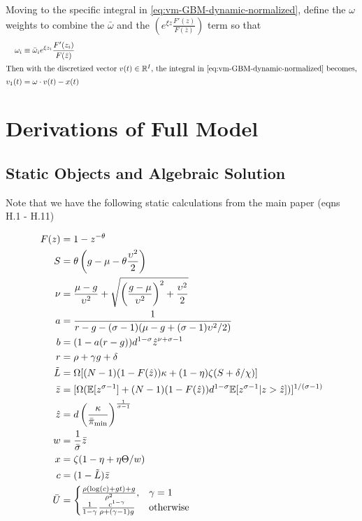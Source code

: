 \documentclass[11pt]{article}
\newcommand{\R}{\ensuremath{\mathbb{R}}}
\begin{document}
Moving to the specific integral in \cref{eq:vm-GBM-dynamic-normalized}, define the $\omega$ weights to combine the $\bar{\omega}$ and the $\left(e^{\xi z} \frac{F'(z)}{F(\bar{z})}\right)$ term so that
\begin{align}
\omega_i &\equiv \bar{\omega}_i e^{\xi z_i}\frac{F'(z_i)}{F(\bar{z})}\\
\intertext{Then with the discretized vector $v(t) \in \R^I$, the integral in \cref{eq:vm-GBM-dynamic-normalized} becomes,}
v_1(t) &= \omega \cdot v(t) - x(t)
\end{align}

\section{Derivations of Full Model}\label{sec:full-model-derivations}

\subsection{Static Objects and Algebraic Solution}\label{sec:full-algebraic-solution}

Note that we have the following static calculations from the main paper (eqns H.1 - H.11)

\begin{align}
	F(z) &= 1 - z^{-\theta} \\
	S &= \theta \left(g - \mu - \theta \frac{\upsilon^2}{2}\right) \\
	\nu &= \frac{\mu - g}{\upsilon^2} + \sqrt{\left(\frac{g - \mu}{\upsilon^2}\right)^2 + \frac{\upsilon^2}{2}} \\
	a &= \frac{1}{r - g - (\sigma - 1)(\mu - g  + (\sigma - 1)\upsilon^2/2)} \\
	b &= (1 - a(r-g))d^{1-\sigma}\hat{z}^{\nu + \sigma -1} \\
	r &= \rho + \gamma g + \delta \\
	\tilde{L} &= \Omega [(N-1)(1 - F(\hat{z}))\kappa + (1-\eta)\zeta(S + \delta/\chi)] \\
	\bar{z} &= [\Omega(\mathbb{E}[z^{\sigma - 1}] + (N-1)(1 - F(\hat{z}))d^{1 - \sigma}\mathbb{E}[z^{\sigma - 1}|z > \hat{z}])]^{1/(\sigma - 1)} \\
	\hat{z} &= d \left(\frac{\kappa}{\bar{\pi}_{\textup{min}}}\right)^{\frac{1}{\sigma - 1}} \\
	w &= \frac{1}{\bar{\sigma}}\bar{z} \\
	x &= \zeta(1 - \eta + \eta \Theta / w) \\
		c &= (1 - \tilde{L})\bar{z} \\
		\bar{U} &=
	\begin{cases}
	\frac{\rho (\log(c) + gt ) + g}{\rho^2}, & \gamma = 1 \\
	\frac{1}{1-\gamma} \frac{c^{1 - \gamma}}{\rho + (\gamma - 1)g} & \text{otherwise}
	\end{cases} 
\end{align}
\end{document}
